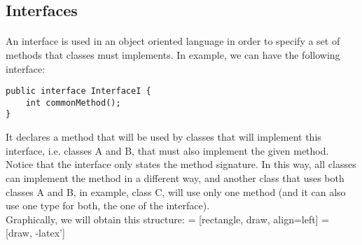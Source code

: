 \documentclass[letterpaper,twocolumn,10pt]{article}
\begin{document}
\subsection{Interfaces} \paragraph{}
An interface is used in an object oriented language in order to specify a set of methods that classes must implements. In example, we can have the following interface:
\begin{verbatim}
public interface InterfaceI {
    int commonMethod();
}
\end{verbatim}
It declares a method that will be used by classes that will implement this interface, i.e. classes A and B, that must also implement the given method. Notice that the interface only states the method signature. In this way, all classes can implement the method in a different way, and another class that uses both classes A and B, in example, class C, will use only one method (and it can also use one type for both, the one of the interface).\\
Graphically, we will obtain this structure:
 = [rectangle, draw, align=left]
 = [draw, -latex']
\begin{center}
\end{center}
\end{document}
